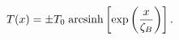 \begin{equation}
T(x)=\pm T_{0}\;{\rm arcsinh}\left[\exp \left(\frac{x}{\zeta_B}\right)\right].
\end{equation}


